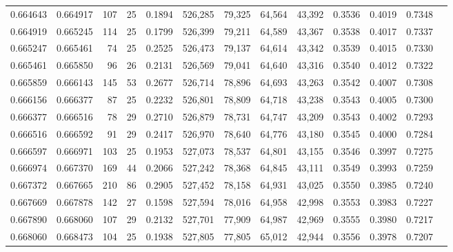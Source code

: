 \begin{tabular}{rrrrrrrrrrrrr}
0.664643 & 0.664917 &   107 &  25 &                                     0.1894 & 526,285 &  79,325 &  64,564 &  43,392 & 0.3536 & 0.4019 & 0.7348 \\
0.664919 & 0.665245 &   114 &  25 &                                     0.1799 & 526,399 &  79,211 &  64,589 &  43,367 & 0.3538 & 0.4017 & 0.7337 \\
0.665247 & 0.665461 &    74 &  25 &                                     0.2525 & 526,473 &  79,137 &  64,614 &  43,342 & 0.3539 & 0.4015 & 0.7330 \\
0.665461 & 0.665850 &    96 &  26 &                                     0.2131 & 526,569 &  79,041 &  64,640 &  43,316 & 0.3540 & 0.4012 & 0.7322 \\
0.665859 & 0.666143 &   145 &  53 &                                     0.2677 & 526,714 &  78,896 &  64,693 &  43,263 & 0.3542 & 0.4007 & 0.7308 \\
0.666156 & 0.666377 &    87 &  25 &                                     0.2232 & 526,801 &  78,809 &  64,718 &  43,238 & 0.3543 & 0.4005 & 0.7300 \\
0.666377 & 0.666516 &    78 &  29 &                                     0.2710 & 526,879 &  78,731 &  64,747 &  43,209 & 0.3543 & 0.4002 & 0.7293 \\
0.666516 & 0.666592 &    91 &  29 &                                     0.2417 & 526,970 &  78,640 &  64,776 &  43,180 & 0.3545 & 0.4000 & 0.7284 \\
0.666597 & 0.666971 &   103 &  25 &                                     0.1953 & 527,073 &  78,537 &  64,801 &  43,155 & 0.3546 & 0.3997 & 0.7275 \\
0.666974 & 0.667370 &   169 &  44 &                                     0.2066 & 527,242 &  78,368 &  64,845 &  43,111 & 0.3549 & 0.3993 & 0.7259 \\
0.667372 & 0.667665 &   210 &  86 &                                     0.2905 & 527,452 &  78,158 &  64,931 &  43,025 & 0.3550 & 0.3985 & 0.7240 \\
0.667669 & 0.667878 &   142 &  27 &                                     0.1598 & 527,594 &  78,016 &  64,958 &  42,998 & 0.3553 & 0.3983 & 0.7227 \\
0.667890 & 0.668060 &   107 &  29 &                                     0.2132 & 527,701 &  77,909 &  64,987 &  42,969 & 0.3555 & 0.3980 & 0.7217 \\
0.668060 & 0.668473 &   104 &  25 &                                     0.1938 & 527,805 &  77,805 &  65,012 &  42,944 & 0.3556 & 0.3978 & 0.7207 \\

\end{tabular}

